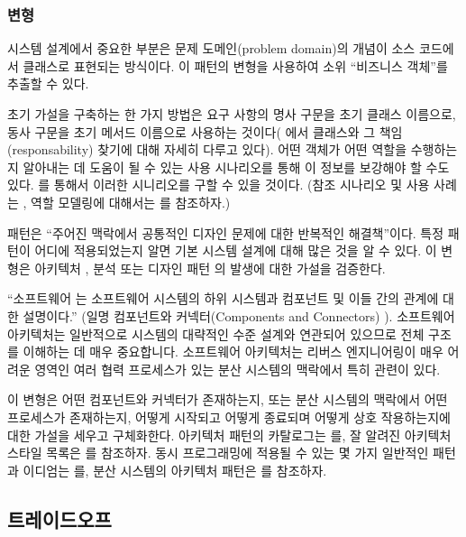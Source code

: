 \documentclass[a4paper,10pt,twoside]{book}
\begin{document}
\subsubsection*{변형}

시스템 설계에서 중요한 부분은 문제 도메인(problem domain)의 개념이 소스 코드에서 클래스로 표현되는 방식이다. 이 패턴의 변형을 사용하여 소위 ``비즈니스 객체''를 추출할 수 있다.

초기 가설을 구축하는 한 가지 방법은 요구 사항의 명사 구문을 초기 클래스 이름으로, 동사 구문을 초기 메서드 이름으로 사용하는 것이다(\cite{Wirf90b} \cite{Bell97a} \cite{Booc94a}에서 클래스와 그 책임(responsability) 찾기에 대해 자세히 다루고 있다). 어떤 객체가 어떤 역할을 수행하는지 알아내는 데 도움이 될 수 있는 사용 시나리오를 통해 이 정보를 보강해야 할 수도 있다. 를 통해서 이러한 시니리오를 구할 수 있을 것이다. (참조 시나리오 및 사용 사례는 \cite{Jaco92a} \cite{Schn98a}, 역할 모델링에 대해서는 \cite{Reen96a} \cite{Rieh98a}를 참조하자.)

패턴은 ``주어진 맥락에서 공통적인 디자인 문제에 대한 반복적인 해결책''이다. 특정 패턴이 어디에 적용되었는지 알면 기본 시스템 설계에 대해 많은 것을 알 수 있다. 이 변형은 아키텍처 \cite{Busc96a}, 분석 \cite{Fowl97b} 또는 디자인 패턴 \cite{Gamm95a}의 발생에 대한 가설을 검증한다.

``소프트웨어 는 소프트웨어 시스템의 하위 시스템과 컴포넌트 및 이들 간의 관계에 대한 설명이다.'' \cite{Busc96a}(일명 컴포넌트와 커넥터(Components and Connectors) \cite{Shaw96a}). 소프트웨어 아키텍처는 일반적으로 시스템의 대략적인 수준 설계와 연관되어 있으므로 전체 구조를 이해하는 데 매우 중요합니다. 소프트웨어 아키텍처는 리버스 엔지니어링이 매우 어려운 영역인 여러 협력 프로세스가 있는 분산 시스템의 맥락에서 특히 관련이 있다.

이 변형은 어떤 컴포넌트와 커넥터가 존재하는지, 또는 분산 시스템의 맥락에서 어떤 프로세스가 존재하는지, 어떻게 시작되고 어떻게 종료되며 어떻게 상호 작용하는지에 대한 가설을 세우고 구체화한다. 아키텍처 패턴의 카탈로그는 \cite{Busc96a}를, 잘 알려진 아키텍처 스타일 목록은 \cite{Shaw96a}를 참조하자. 동시 프로그래밍에 적용될 수 있는 몇 가지 일반적인 패턴과 이디엄는 \cite{Lea96a}를, 분산 시스템의 아키텍처 패턴은 \cite{Schm00a}를 참조하자.

\subsection*{트레이드오프}
\end{document}

